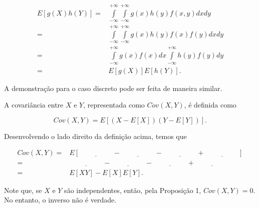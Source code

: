 \documentclass[
  letterpaper,
  DIV=11,
  numbers=noendperiod]{scrreprt}
\begin{document}
\[\begin{aligned}
E[g(X)h(Y)] =& \int\limits_{-\infty}^{+\infty}\int\limits_{-\infty}^{+\infty} g(x)h(y)f(x,y)dxdy\\
=& \int\limits_{-\infty}^{+\infty}\int\limits_{-\infty}^{+\infty} g(x)h(y)f(x)f(y)dxdy\\
=& \int\limits_{-\infty}^{+\infty}g(x)f(x)dx\int\limits_{-\infty}^{+\infty} h(y)f(y)dy\\
=&  E[g(X)]E[h(Y)].
\end{aligned}\]

A demonstração para o caso discreto pode ser feita de maneira similar.

\begin{tcolorbox}[enhanced jigsaw, colback=white, leftrule=.75mm, colbacktitle=quarto-callout-important-color!10!white, breakable, titlerule=0mm, bottomtitle=1mm, title=\textcolor{quarto-callout-important-color}{\faExclamation}\hspace{0.5em}{Definição 1:}, colframe=quarto-callout-important-color-frame, toprule=.15mm, opacityback=0, bottomrule=.15mm, opacitybacktitle=0.6, arc=.35mm, toptitle=1mm, rightrule=.15mm, coltitle=black, left=2mm]

A covariância entre \(X\) e \(Y\), representada como \(Cov(X,Y)\), é
definida como

\[Cov(X,Y) = E[(X-E[X])(Y-E[Y])].\]

\end{tcolorbox}

Desenvolvendo o lado direito da definição acima, temos que

\[\begin{aligned}
Cov(X,Y) = & E[\underline{\hspace{2cm}} - \underline{\hspace{2cm}} - \underline{\hspace{2cm}} + \underline{\hspace{2cm}}]\\
=& \underline{\hspace{2cm}} - \underline{\hspace{2cm}} - \underline{\hspace{2cm}} + \underline{\hspace{2cm}}\\
=& E[XY] - E[X]E[Y].
\end{aligned}\]

Note que, se \(X\) e \(Y\) são independentes, então, pela Proposição 1,
\(Cov(X,Y) = 0\). No entanto, o inverso não é verdade.
\end{document}
